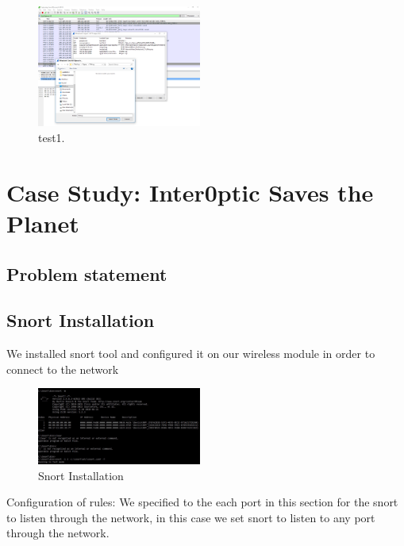 \documentclass{article}
\begin{document}
\begin{figure}[H]
	\begin{center}
		\includegraphics[width=0.48\textwidth]{FILECARVING2.png}
	\end{center}
	\caption{test1.}
	\label{fig:Prd}
\end{figure}


\section{Case Study: Inter0ptic Saves the Planet}


\subsection{Problem statement}


\subsection{Snort Installation}
We installed snort tool and configured it on our wireless module in order to connect to the network


\begin{figure}[H]
	\begin{center}
		\includegraphics[width=0.48\textwidth]{SnortIns.jpg}
	\end{center}
	\caption{Snort Installation}
	\label{fig:SnortIns}
\end{figure}


Configuration of rules:
We specified to the each port in this section for the snort to listen through the network, in this case we set snort to listen to any port through the network.
\end{document}
